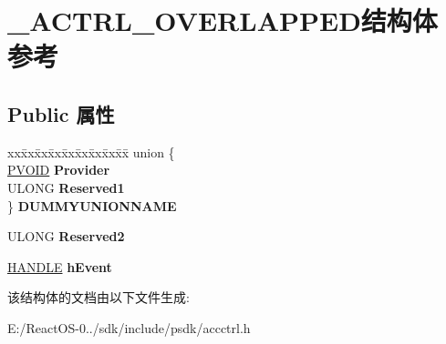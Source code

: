 \hypertarget{struct___a_c_t_r_l___o_v_e_r_l_a_p_p_e_d}{}\section{\+\_\+\+A\+C\+T\+R\+L\+\_\+\+O\+V\+E\+R\+L\+A\+P\+P\+E\+D结构体 参考}
\label{struct___a_c_t_r_l___o_v_e_r_l_a_p_p_e_d}
\subsection*{Public 属性}
\begin{DoxyCompactItemize}
\item 
\mbox{\label{struct___a_c_t_r_l___o_v_e_r_l_a_p_p_e_d_acfe37857d4a3d121043b66f02e6ef226}} 
\begin{tabbing}
xx\=xx\=xx\=xx\=xx\=xx\=xx\=xx\=xx\=\kill
union \{\\
\>\hyperlink{interfacevoid}{PVOID} {\bfseries Provider}\\
\>ULONG {\bfseries Reserved1}\\
\} {\bfseries DUMMYUNIONNAME}\\

\end{tabbing}\item 
\mbox{\label{struct___a_c_t_r_l___o_v_e_r_l_a_p_p_e_d_a86731e34fb427a484c13dda7d3fe07aa}} 
U\+L\+O\+NG {\bfseries Reserved2}
\item 
\mbox{\label{struct___a_c_t_r_l___o_v_e_r_l_a_p_p_e_d_a1900bf352296ef52360d58b3f66d5241}} 
\hyperlink{interfacevoid}{H\+A\+N\+D\+LE} {\bfseries h\+Event}
\end{DoxyCompactItemize}


该结构体的文档由以下文件生成\+:\begin{DoxyCompactItemize}
\item 
E\+:/\+React\+O\+S-\/0../sdk/include/psdk/accctrl.\+h\end{DoxyCompactItemize}
